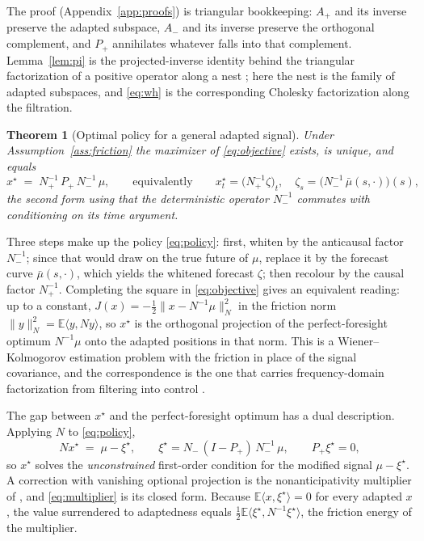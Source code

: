 \documentclass[11pt]{article}
\newcommand{\E}{\mathbb{E}}
\theoremstyle{plain}
\newtheorem{theorem}{Theorem}
\theoremstyle{definition}
\theoremstyle{remark}
\begin{document}
The proof (Appendix~\ref{app:proofs}) is triangular bookkeeping: $A_+$ and its inverse preserve the adapted subspace, $A_-$ and its inverse preserve the orthogonal complement, and $P_+$ annihilates whatever falls into that complement. Lemma~\ref{lem:pi} is the projected-inverse identity behind the triangular factorization of a positive operator along a nest \citep{GohbergKrein1970,Arveson1975}; here the nest is the family of adapted subspaces, and \eqref{eq:wh} is the corresponding Cholesky factorization along the filtration.

\begin{theorem}[Optimal policy for a general adapted signal]\label{thm:general}
Under Assumption~\ref{ass:friction} the maximizer of \eqref{eq:objective} exists, is unique, and equals
\begin{equation}\label{eq:policy}
x^\star \;=\; N_+^{-1}\,P_+\,N_-^{-1}\,\mu ,
\qquad\text{equivalently}\qquad
x^\star_t = \bigl(N_+^{-1}\zeta\bigr)_t, \quad
\zeta_s = \bigl(N_-^{-1}\,\bar\mu(s,\cdot)\bigr)(s),
\end{equation}
the second form using that the deterministic operator $N_-^{-1}$ commutes with conditioning on its time argument.
\end{theorem}

Three steps make up the policy \eqref{eq:policy}: first, whiten by the anticausal factor $N_-^{-1}$; since that would draw on the true future of $\mu$, replace it by the forecast curve $\bar\mu(s,\cdot)$, which yields the whitened forecast $\zeta$; then recolour by the causal factor $N_+^{-1}$. Completing the square in \eqref{eq:objective} gives an equivalent reading: up to a constant, $J(x)=-\tfrac12\|x-N^{-1}\mu\|_N^2$ in the friction norm $\|y\|_N^2=\E\langle y,Ny\rangle$, so $x^\star$ is the orthogonal projection of the perfect-foresight optimum $N^{-1}\mu$ onto the adapted positions in that norm. This is a Wiener--Kolmogorov estimation problem with the friction in place of the signal covariance, and the correspondence is the one that carries frequency-domain factorization from filtering into control \citep{Wiener1949,Whittle1963,Whiteman1985}.

The gap between $x^\star$ and the perfect-foresight optimum has a dual description. Applying $N$ to \eqref{eq:policy},
\begin{equation}\label{eq:multiplier}
N x^\star \;=\; \mu - \xi^\star, \qquad
\xi^\star = N_-\,(I-P_+)\,N_-^{-1}\,\mu, \qquad P_+\xi^\star=0 ,
\end{equation}
so $x^\star$ solves the \emph{unconstrained} first-order condition for the modified signal $\mu-\xi^\star$. A correction with vanishing optional projection is the nonanticipativity multiplier of \citet{RockafellarWets1976}, and \eqref{eq:multiplier} is its closed form. Because $\E\langle x,\xi^\star\rangle=0$ for every adapted $x$, the value surrendered to adaptedness equals $\tfrac12\E\langle\xi^\star,N^{-1}\xi^\star\rangle$, the friction energy of the multiplier.
\end{document}
